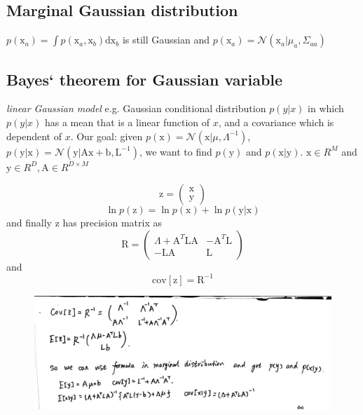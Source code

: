 \documentclass[a4paper]{book}
\begin{document}
\subsection{Marginal Gaussian distribution}
$p(\mathrm x_a) = \int p(\mathrm x_a,\mathrm x_b)\mathrm d\mathrm x_b$ is
still Gaussian and
$p(\mathrm x_a)= \mathcal N(\mathrm x_a|\mu_a,\Sigma_{aa})$
\subsection{Bayes‘ theorem for Gaussian variable}
\emph{linear Gaussian model}  e.g. Gaussian conditional distribution $p(y|x)$ in which $p(y|x)$ has a mean that is a linear function of $x$, and a covariance which is dependent of $x$. \newline
Our goal: given $p(\mathrm x) = \mathcal {N}(\mathrm x|\mu,\Lambda^{-1})$, $p(\mathrm y|\mathrm x) = \mathcal N(\mathrm y|\mathrm A\mathrm x+\mathrm b,\mathrm L^{-1})$, we want to find  $p(\mathrm y)$ and $p(\mathrm x|\mathrm y)$. \newline
$\mathrm x\in R^M$ and $\mathrm y \in R^D, \mathrm A\in R^{D\times M }$

$$\mathrm z=\left(\begin{matrix}\mathrm x\\\mathrm y\end{matrix}\right)$$
$$\ln p(\mathrm z) =\ln p(\mathrm x)+\ln p(\mathrm y|\mathrm x) $$
and finally $\mathrm z$ has precision matrix as
$$\mathrm R = \left(\begin{matrix}\Lambda+\mathrm A^T\mathrm L\mathrm A&-\mathrm A^T\mathrm L\\-\mathrm L\mathrm A&\mathrm L \end{matrix}\right)$$
and $$\mathrm {cov}[\mathrm z] = \mathrm R^{-1} $$
\begin{figure}
  \centering
  \includegraphics[width=\textwidth]{./imgs/GD1.jpg}
  \label{fig1.1}
\end{figure}
\end{document}
